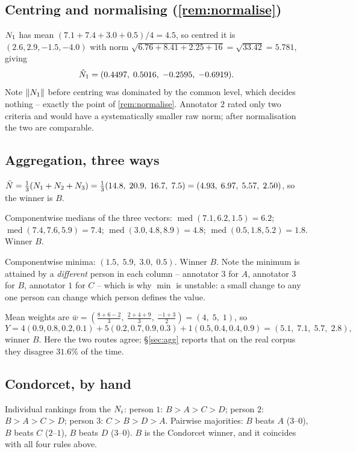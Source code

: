 \subsection{Centring and normalising (\cref{rem:normalise})}

$N_1$ has mean $(7.1+7.4+3.0+0.5)/4 = 4.5$, so centred it is
$(2.6,2.9,-1.5,-4.0)$ with norm
$\sqrt{6.76+8.41+2.25+16}=\sqrt{33.42}=5.781$, giving
\[
\hat {N}_1 = (0.4497,\;0.5016,\;-0.2595,\;-0.6919).
\]
Note $\|N_1\|$ before centring was dominated by the common level, which decides
nothing -- exactly the point of \cref{rem:normalise}. Annotator $2$ rated only two
criteria and would have a systematically smaller raw norm; after normalisation
the two are comparable.

\subsection{Aggregation, three ways}

 $\bar{N} = \tfrac13(N_1+N_2+N_3)
= \tfrac13(14.8,\;20.9,\;16.7,\;7.5) = (4.93,\;6.97,\;5.57,\;2.50)$, so the winner
is $B$.

 Componentwise medians of the three vectors:
$\operatorname{med}(7.1,6.2,1.5)=6.2$;
$\operatorname{med}(7.4,7.6,5.9)=7.4$;
$\operatorname{med}(3.0,4.8,8.9)=4.8$;
$\operatorname{med}(0.5,1.8,5.2)=1.8$. Winner $B$.

 Componentwise minima:
$(1.5,\;5.9,\;3.0,\;0.5)$. Winner $B$. Note the minimum is attained by a
\emph{different} person in each column -- annotator $3$ for $A$, annotator $3$ for
$B$, annotator $1$ for $C$ -- which is why $\min$ is unstable: a small change to
any one person can change which person defines the value.

 Mean weights are
$\bar w = (\tfrac{8+6-2}{3},\ \tfrac{2+4+9}{3},\ \tfrac{-1+3}{2}) = (4,\;5,\;1)$,
so
\[
Y = 4(0.9,0.8,0.2,0.1)+5(0.2,0.7,0.9,0.3)+1(0.5,0.4,0.4,0.9) = (5.1,\;7.1,\;5.7,\;2.8),
\]
winner $B$. Here the two routes agree; §\ref{sec:agg} reports that on the real
corpus they disagree $31.6\%$ of the time.

\subsection{Condorcet, by hand}

Individual rankings from the $N_i$: person $1$: $B\!>\!A\!>\!C\!>\!D$;
person $2$: $B\!>\!A\!>\!C\!>\!D$; person $3$: $C\!>\!B\!>\!D\!>\!A$.
Pairwise majorities: $B$ beats $A$ ($3$--$0$), $B$ beats $C$ ($2$--$1$),
$B$ beats $D$ ($3$--$0$). $B$ is the Condorcet winner, and it coincides with all
four rules above.

